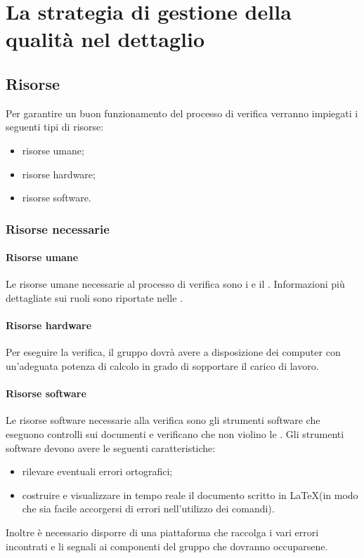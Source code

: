 \documentclass[PianoDiQualifica.tex]{subfiles}
\begin{document}
\section{La strategia di gestione della qualità nel dettaglio}

	\subsection{Risorse}
	Per garantire un buon funzionamento del processo di verifica verranno impiegati i seguenti tipi di risorse:
	\begin{itemize}
		\item risorse umane;
		\item risorse hardware;
		\item risorse software.
	\end{itemize}
	
		\subsubsection{Risorse necessarie}
		
			\paragraph{Risorse umane}
			Le risorse umane necessarie al processo di verifica sono i \VERP{} e il \RESP{}. Informazioni più dettagliate sui ruoli sono riportate nelle \NPdocRR{}.
			
			\paragraph{Risorse hardware}
			Per eseguire la verifica, il gruppo dovrà avere a disposizione dei computer con un'adeguata potenza di calcolo in grado di sopportare il carico di lavoro.
			
			\paragraph{Risorse software}
			Le risorse software necessarie alla verifica sono gli strumenti software che eseguono controlli sui documenti e verificano che non violino le \NPdocRR{}.
			Gli strumenti software devono avere le seguenti caratteristiche:
			\begin{itemize}
				\item rilevare eventuali errori ortografici;
				\item costruire e visualizzare in tempo reale il documento scritto in \LaTeX (in modo che sia facile accorgersi di errori nell’utilizzo dei comandi).
			\end{itemize}
			Inoltre è necessario disporre di una piattaforma che raccolga i vari errori incontrati e li segnali ai componenti del gruppo che dovranno occuparsene.
			
\end{document}
